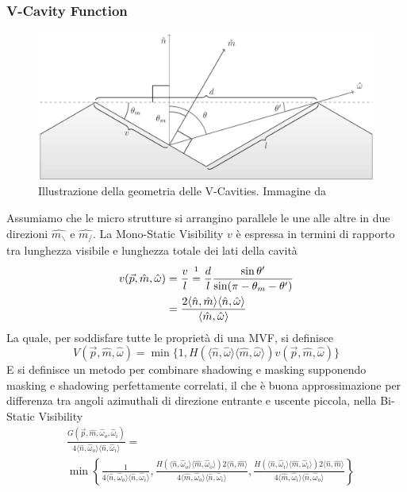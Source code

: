 \subsubsection{V-Cavity Function}
\begin{figure}[tb]
	\centering
	\includegraphics[width=0.9\linewidth]{../assets/chapter3_surface_vcavityPG.png}
	\caption{Illustrazione della geometria delle V-Cavities. Immagine da \cite{pegoraro}}
	\label{chapter3:surface:vcavity}
\end{figure}
Assumiamo che le micro strutture si arrangino parallele le une alle altre in due direzioni $\hat{m_\backslash}$ e $\hat{m_/}$. La Mono-Static Visibility
$v$ \`e espressa in termini di rapporto tra lunghezza visibile e lunghezza totale dei lati della cavit\`a
\begin{align}
	v(\vec{p},\hat{m},\hat{\omega})&=\frac{v}{l}\stackrel{\footnotemark{}}{=}\frac{d}{l}\frac{\sin\theta^\prime}{\sin(\pi-\theta_m-\theta^\prime)} 
		\nonumber\\
		&= \frac{2\langle\hat{n},\hat{m}\rangle\langle\hat{n},\hat{\omega}\rangle}{\langle\hat{m},\hat{\omega}\rangle}
\end{align}
La quale, per soddisfare tutte le propriet\`a di una MVF, si definisce 
\begin{equation}
	V(\vec{p},\hat{m},\hat{\omega})=\min\{1,H(\langle\hat{n},\hat{\omega}\rangle\langle\hat{m},\hat{\omega}\rangle)v(\vec{p},\hat{m},\hat{\omega})\}
\end{equation}
E si definisce un metodo per combinare shadowing e masking supponendo masking e shadowing perfettamente correlati, il che \`e buona 
approssimazione per differenza tra angoli azimuthali di direzione entrante e uscente piccola, nella Bi-Static Visibility\footnotemark{}
\begin{align}
	&\frac{G(\vec{p},\hat{m},\hat{\omega}_o,\hat{\omega}_i)}{4\langle\hat{n},\hat{\omega}_o\rangle\langle\hat{n},\hat{\omega}_i\rangle}=\\
		&\min\left\{\frac{1}{4\langle\hat{n},\hat{\omega}_o\rangle\langle\hat{n},\hat{\omega}_i\rangle},%
		\frac{H(\langle\hat{n},\hat{\omega}_o\rangle\langle\hat{m},\hat{\omega}_o\rangle)2\langle\hat{n},\hat{m}\rangle}%
			{4\langle\hat{m},\hat{\omega}_o\rangle\langle\hat{n},\hat{\omega}_i\rangle},%
		\frac{H(\langle\hat{n},\hat{\omega}_i\rangle\langle\hat{m},\hat{\omega}_i\rangle)2\langle\hat{n},\hat{m}\rangle}%
			{4\langle\hat{m},\hat{\omega}_i\rangle\langle\hat{n},\hat{\omega}_o\rangle}\right\}
\end{align}
